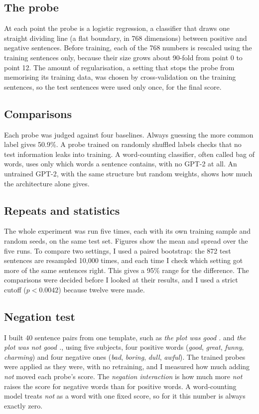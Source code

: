 \documentclass[10pt,twocolumn]{article}
\begin{document}
\subsection{The probe}
At each point the probe is a logistic regression, a classifier that draws one straight dividing line (a flat boundary, in 768 dimensions) between positive and negative sentences. Before training, each of the 768 numbers is rescaled using the training sentences only, because their size grows about 90-fold from point 0 to point 12. The amount of regularisation, a setting that stops the probe from memorising its training data, was chosen by cross-validation on the training sentences, so the test sentences were used only once, for the final score.

\subsection{Comparisons}
Each probe was judged against four baselines. Always guessing the more common label gives 50.9\%. A probe trained on randomly shuffled labels checks that no test information leaks into training. A word-counting classifier, often called bag of words, uses only which words a sentence contains, with no GPT-2 at all. An untrained GPT-2, with the same structure but random weights, shows how much the architecture alone gives.

\subsection{Repeats and statistics}
The whole experiment was run five times, each with its own training sample and random seeds, on the same test set. Figures show the mean and spread over the five runs. To compare two settings, I used a paired bootstrap: the 872 test sentences are resampled 10,000 times, and each time I check which setting got more of the same sentences right. This gives a 95\% range for the difference. The comparisons were decided before I looked at their results, and I used a strict cutoff ($p < 0.0042$) because twelve were made.

\subsection{Negation test}
I built 40 sentence pairs from one template, such as \textit{the plot was good .} and \textit{the plot was not good .}, using five subjects, four positive words (\textit{good}, \textit{great}, \textit{funny}, \textit{charming}) and four negative ones (\textit{bad}, \textit{boring}, \textit{dull}, \textit{awful}). The trained probes were applied as they were, with no retraining, and I measured how much adding \textit{not} moved each probe's score. The \emph{negation interaction} is how much more \textit{not} raises the score for negative words than for positive words. A word-counting model treats \textit{not} as a word with one fixed score, so for it this number is always exactly zero.
\end{document}
